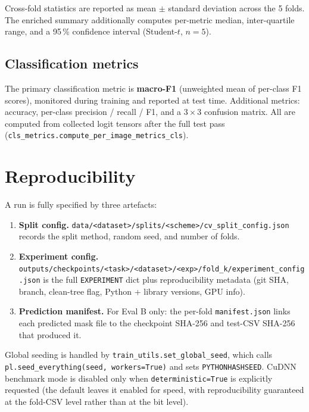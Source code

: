\documentclass[12pt,a4paper]{article}
\begin{document}
Cross-fold statistics are reported as mean $\pm$ standard deviation
across the 5 folds.  The enriched summary additionally computes per-metric
median, inter-quartile range, and a 95\,\% confidence interval
(Student-$t$, $n=5$).

\subsection{Classification metrics}

The primary classification metric is \textbf{macro-F1}
(unweighted mean of per-class F1 scores), monitored during training and
reported at test time.  Additional metrics: accuracy, per-class precision /
recall / F1, and a $3\times 3$ confusion matrix.
All are computed from collected logit tensors after the full test pass
(\texttt{cls\_metrics.compute\_per\_image\_metrics\_cls}).

\section{Reproducibility}

A run is fully specified by three artefacts:

\begin{enumerate}[leftmargin=1.5em]
  \item \textbf{Split config.}
    \texttt{data/<dataset>/splits/<scheme>/cv\_split\_config.json} records the
    split method, random seed, and number of folds.
  \item \textbf{Experiment config.}
    \texttt{outputs/checkpoints/<task>/<dataset>/<exp>/fold\_k/experiment\_config.json}
    is the full \texttt{EXPERIMENT} dict plus reproducibility metadata
    (git SHA, branch, clean-tree flag, Python + library versions, GPU info).
  \item \textbf{Prediction manifest.}  For Eval B only: the per-fold
    \texttt{manifest.json} links each predicted mask file to the checkpoint
    SHA-256 and test-CSV SHA-256 that produced it.
\end{enumerate}

Global seeding is handled by \texttt{train\_utils.set\_global\_seed}, which
calls \texttt{pl.seed\_everything(seed, workers=True)} and sets
\texttt{PYTHONHASHSEED}.  CuDNN benchmark mode is disabled only when
\texttt{deterministic=True} is explicitly requested (the default leaves it
enabled for speed, with reproducibility guaranteed at the fold-CSV level rather
than at the bit level).
\end{document}
